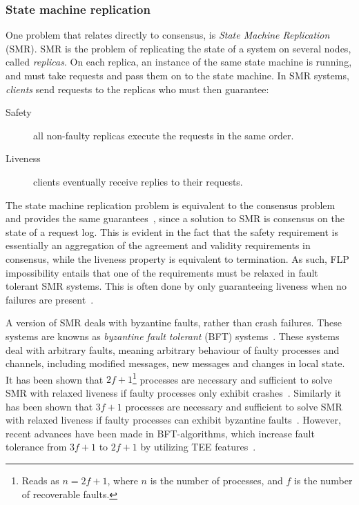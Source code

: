 \documentclass{article}
\begin{document}
		\subsubsection{State machine replication}

		One problem that relates directly to consensus, is \textit{State Machine Replication}~\cite{schneider_implementing_1990} (SMR).
		SMR is the problem of replicating the state of a system on several nodes, called \textit{replicas}.
		On each replica, an instance of the same state machine is running, and must take requests and pass them on to the state machine.
		In SMR systems, \textit{clients} send requests to the replicas who must then guarantee:
		\begin{description}
			\item[Safety] all non-faulty replicas execute the requests in the same order.
			\item[Liveness] clients eventually receive replies to their requests.
		\end{description}
		The state machine replication problem is equivalent to the consensus problem and provides the same guarantees~\cite{schneider_implementing_1990}, since a solution to SMR is consensus on the state of a request log.
		This is evident in the fact that the safety requirement is essentially an aggregation of the agreement and validity requirements in consensus, while the liveness property is equivalent to termination.
		As such, FLP impossibility entails that one of the requirements must be relaxed in fault tolerant SMR systems.
		This is often done by only guaranteeing liveness when no failures are present~\cite{chandra_unreliable_1996,lamport_part-time_1998,castro_practical_1999,kotla_zyzzyva_2007}.

		A version of SMR deals with byzantine faults, rather than crash failures.
		These systems are knowns as \textit{byzantine fault tolerant} (BFT) systems~\cite{castro_practical_1999,correia_byzantine_2011,veronese_efficient_2013,liu_scalable_2016}.
		These systems deal with arbitrary faults, meaning arbitrary behaviour of faulty processes and channels, including modified messages, new messages and changes in local state.
		It has been shown that $2f+1$\footnote{Reads as $n=2f+1$, where $n$ is the number of processes, and $f$ is the number of recoverable faults.} processes are necessary and sufficient to solve SMR with relaxed liveness if faulty processes only exhibit crashes~\cite{bracha_asynchronous_1985}.
		Similarly it has been shown that $3f+1$ processes are necessary and sufficient to solve SMR with relaxed liveness if faulty processes can exhibit byzantine faults~\cite{bracha_asynchronous_1985,pease_reaching_1980}.
		However, recent advances have been made in BFT-algorithms, which increase fault tolerance from $3f+1$ to $2f+1$ by utilizing TEE features~\cite{liu_scalable_2016,kapitza_cheapbft_2012,veronese_efficient_2013}.
\end{document}
